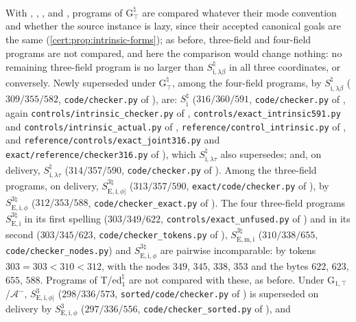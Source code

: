 With , , ,
 and , programs of
G$^{\natural}_{\top}$ are compared whatever their mode convention and whether the source instance is
lazy, since their accepted canonical goals are the same (\cref{cert:prop:intrinsic-forms}); as
before, three-field and four-field programs are not compared, and here the comparison would change
nothing: no remaining three-field program is no larger than $S^{\natural}_{\mathrm{i},\lambda\beta}$
in all three coordinates, or conversely. Newly superseded under G$^{\natural}_{\top}$, among the
four-field programs, by $S^{\natural}_{\mathrm{i},\lambda\beta}$ ($309/355/582$,
\texttt{code/checker.py} of ), are: $S^{\natural}_{\mathrm i}$
($316/360/591$, \texttt{code/checker.py} of , again
\texttt{controls/intrinsic\_checker.py} of ,
\texttt{controls/exact\_intrinsic591.py} and \texttt{controls/intrinsic\_actual.py} of
, \texttt{reference/control\_intrinsic.py} of ,
and \texttt{reference/controls/exact\_joint316.py} and \texttt{exact/reference/checker316.py} of
), which $S^{\natural}_{\mathrm{i},\lambda\tau}$ also supersedes;
and, on delivery, $S^{\natural}_{\mathrm{i},\lambda\tau}$ ($314/357/590$, \texttt{code/checker.py}
of ). Among the three-field programs, on delivery,
$S^{3\natural}_{\mathrm{E,i},\phi|}$ ($313/357/590$, \texttt{exact/code/checker.py} of
), by $S^{3\natural}_{\mathrm{E,i},\phi}$ ($312/353/588$,
\texttt{code/checker\_exact.py} of ). The four three-field programs
$S^{3\natural}_{\mathrm{E,i}}$ in its first spelling ($303/349/622$,
\texttt{controls/exact\_unfused.py} of ) and in its second
($303/345/623$, \texttt{code/checker\_tokens.py} of ),
$S^{3\natural}_{\mathrm{E,m,i}}$ ($310/338/655$, \texttt{code/checker\_nodes.py}) and
$S^{3\natural}_{\mathrm{E,i},\phi}$ are pairwise incomparable: by tokens $303=303<310<312$, with the
nodes $349$, $345$, $338$, $353$ and the bytes $622$, $623$, $655$, $588$. Programs of
T/ed$_1^{\natural}$ are not compared with these, as before. Under G$_{1,\top}$/$\mathcal A^{-}$,
$S^{3}_{\mathrm{E,i},\phi|}$ ($298/336/573$, \texttt{sorted/code/checker.py} of
) is superseded on delivery by $S^{3}_{\mathrm{E,i},\phi}$
($297/336/556$, \texttt{code/checker\_sorted.py} of ), and
